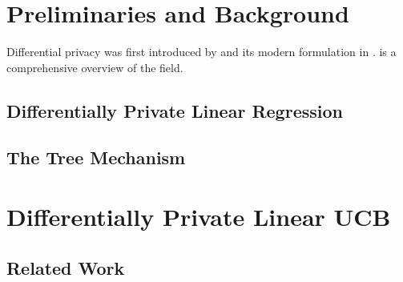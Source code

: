 \documentclass{article}
\begin{document}
\section{Preliminaries and Background}
\label{sec:background}

Differential privacy was first introduced by
\citet{DworkCalibratingNoiseSensitivity2006} and its modern
formulation in \citet{DworkDifferentialPrivacy2006}.
 is a comprehensive
overview of the field.





\subsection{Differentially Private Linear Regression}
\label{sec:dp-regression}

\subsection{The Tree Mechanism}
\label{sec:tree-mechanism}

\section{Differentially Private Linear UCB}

\subsection{Related Work}
\label{sec:related-work}
\end{document}
